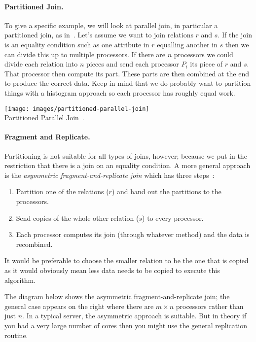 \paragraph{Partitioned Join. }To give a specific example, we will look at parallel join, in particular a partitioned join, as in~\cite{dsc}. Let's assume we want to join relations $r$ and $s$. If the join is an equality condition such as one attribute in $r$ equalling another in $s$ then we can divide this up to multiple processors. If there are $n$ processors we could divide each relation into $n$ pieces and send each processor $P_{i}$ its piece of $r$ and $s$. That processor then compute its part. These parts are then combined at the end to produce the correct data. Keep in mind that we do probably want to partition things with a histogram approach so each processor has roughly equal work.

\begin{center}
\texttt{[image: images/partitioned-parallel-join]}\\
Partitioned Parallel Join~\cite{dsc}.
\end{center}

\paragraph{Fragment and Replicate.} Partitioning is not suitable for all types of joins, however; because we put in the restriction that there is a join on an equality condition. A more general approach is the \textit{asymmetric fragment-and-replicate join} which has three steps~\cite{dsc}:

\begin{enumerate}
\item Partition one of the relations ($r$) and hand out the partitions to the processors.
\item Send copies of the whole other relation ($s$) to every processor.
\item Each processor computes its join (through whatever method) and the data is recombined. 
\end{enumerate}

It would be preferable to choose the smaller relation to be the one that is copied as it would obviously mean less data needs to be copied to execute this algorithm.

The diagram below shows the asymmetric fragment-and-replicate join; the general case appears on the right where there are $m \times n$ processors rather than just $n$. In a typical server, the asymmetric approach is suitable. But in theory if you had a very large number of cores then you might use the general replication routine. 

